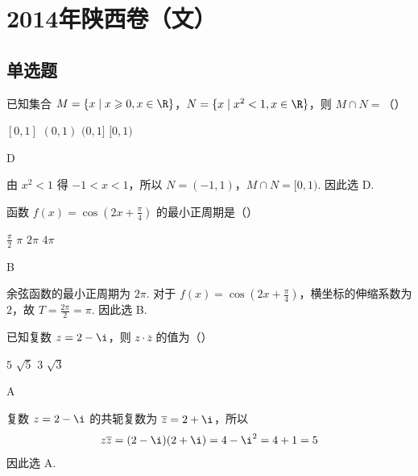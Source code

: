 
\chapter{2014年陕西卷（文）}

\section{单选题}

\begin{problem}
已知集合 \(M = \{x \mid x \geqslant 0, x \in \R\}\)，\(N = \{x \mid x^2 < 1, x \in \R\}\)，则 \(M \cap N =\)（\quad）

\choices
    {\([0,1]\)}
    {\((0,1)\)}
    {\((0,1]\)}
    {\([0,1)\)}
\begin{answer}
D
\end{answer}
\begin{solution}
由 \(x^2<1\) 得 \(-1<x<1\)，所以
\(N=(-1,1)\)，\(M\cap N=[0,1)\).
因此选 D.
\end{solution}
\end{problem}

\begin{problem}
函数 \( f(x) = \cos \left(2x + \frac{\pi}{4}\right) \) 的最小正周期是（\quad）

\choices
    {\(\frac{\pi}{2}\)}
    {\(\pi\)}
    {\(2\pi\)}
    {\(4\pi\)}
\begin{answer}
B
\end{answer}
\begin{solution}
余弦函数的最小正周期为 \(2\pi\). 对于 \(f(x)=\cos(2x+\frac{\pi}{4})\)，横坐标的伸缩系数为 \(2\)，故 \(T=\frac{2\pi}{2}=\pi\).
因此选 B.
\end{solution}
\end{problem}

\begin{problem}
已知复数 \(z = 2 - \i\)，则 \(z \cdot \overline{z}\) 的值为（\quad）

\choices
    {\(5\)}
    {\(\sqrt{5}\)}
    {\(3\)}
    {\(\sqrt{3}\)}
\begin{answer}
A
\end{answer}
\begin{solution}
复数 \(z=2-\i\) 的共轭复数为 \(\overline{z}=2+\i\)，所以
\[
z\overline{z}=(2-\i)(2+\i)=4-\i^2=4+1=5
\]
因此选 A.
\end{solution}
\end{problem}

